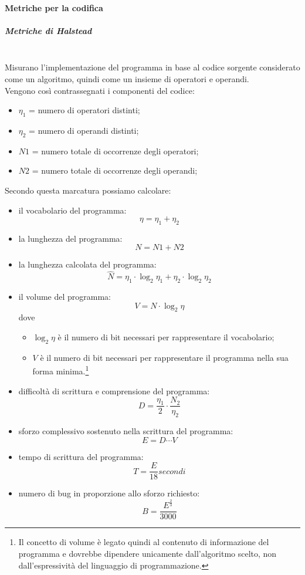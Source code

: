 \paragraph{Metriche per la codifica}
\subparagraph{Metriche di Halstead}\mbox{}\\
Misurano l'implementazione del programma in base al codice sorgente considerato come un algoritmo, quindi come un insieme di operatori e operandi.\\
Vengono così contrassegnati i componenti del codice:
\begin{itemize}
	\item $\eta_{1}$ = numero di operatori distinti;
	\item $\eta_{2}$ = numero di operandi distinti;
	\item $N1$ = numero totale di occorrenze degli operatori; 
	\item $N2$ = numero totale di occorrenze degli operandi;
\end{itemize}
Secondo questa marcatura possiamo calcolare:
\begin{itemize}
	\item il vocabolario del programma:
		\[ \eta = \eta_{1} + \eta_{2} \]
	\item la lunghezza del programma:
		\[ N = N1 + N2 \]
	\item la lunghezza calcolata del programma: 
		\[ {\hat {N}}=\eta_{1} \cdot \log_{2}\eta_{1}+\eta_{2} \cdot \log_{2}\eta_{2} \]
	\item il volume del programma:
		\[ V = N \cdot \log_{2}\eta \] 
		dove
		\begin{itemize}
			\item $ \log_{2}\eta $ è il numero di bit necessari per rappresentare il vocabolario;
			\item $ V $ è il numero di bit necessari per rappresentare il programma nella sua forma minima.\footnote{Il concetto di volume è legato quindi al contenuto di informazione del programma e dovrebbe dipendere unicamente dall'algoritmo scelto, non dall'espressività del linguaggio di programmazione.}
		\end{itemize}
	\item difficoltà di scrittura e comprensione del programma:
		\[ D = \frac{\eta_{1}}{2} \cdot \frac{N_{2}}{\eta_{2}} \]
	\item sforzo complessivo sostenuto nella scrittura del programma:
		\[ E = D \cdots V \]
	\item tempo di scrittura del programma:
		\[ T=\frac{E}{18} secondi\]
	\item numero di bug in proporzione allo sforzo richiesto:
		\[ B = \frac{E^{\frac{2}{3}}}{3000} \]	
\end{itemize}

